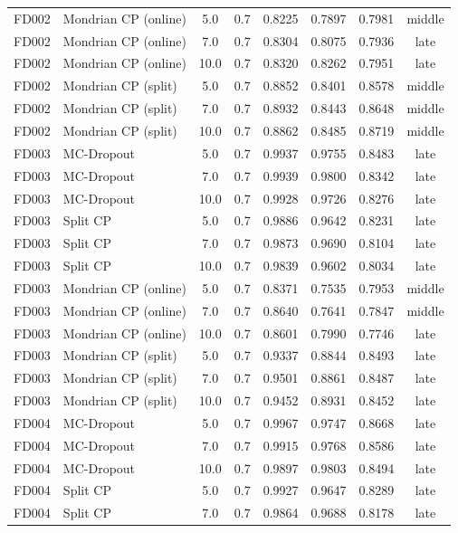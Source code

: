 \begin{table}[t]
\begin{tabular}{llcccccc}
FD002 & Mondrian CP (online) & 5.0 & 0.7 & 0.8225 & 0.7897 & 0.7981 & middle \\
FD002 & Mondrian CP (online) & 7.0 & 0.7 & 0.8304 & 0.8075 & 0.7936 & late \\
FD002 & Mondrian CP (online) & 10.0 & 0.7 & 0.8320 & 0.8262 & 0.7951 & late \\
FD002 & Mondrian CP (split) & 5.0 & 0.7 & 0.8852 & 0.8401 & 0.8578 & middle \\
FD002 & Mondrian CP (split) & 7.0 & 0.7 & 0.8932 & 0.8443 & 0.8648 & middle \\
FD002 & Mondrian CP (split) & 10.0 & 0.7 & 0.8862 & 0.8485 & 0.8719 & middle \\
FD003 & MC-Dropout & 5.0 & 0.7 & 0.9937 & 0.9755 & 0.8483 & late \\
FD003 & MC-Dropout & 7.0 & 0.7 & 0.9939 & 0.9800 & 0.8342 & late \\
FD003 & MC-Dropout & 10.0 & 0.7 & 0.9928 & 0.9726 & 0.8276 & late \\
FD003 & Split CP & 5.0 & 0.7 & 0.9886 & 0.9642 & 0.8231 & late \\
FD003 & Split CP & 7.0 & 0.7 & 0.9873 & 0.9690 & 0.8104 & late \\
FD003 & Split CP & 10.0 & 0.7 & 0.9839 & 0.9602 & 0.8034 & late \\
FD003 & Mondrian CP (online) & 5.0 & 0.7 & 0.8371 & 0.7535 & 0.7953 & middle \\
FD003 & Mondrian CP (online) & 7.0 & 0.7 & 0.8640 & 0.7641 & 0.7847 & middle \\
FD003 & Mondrian CP (online) & 10.0 & 0.7 & 0.8601 & 0.7990 & 0.7746 & late \\
FD003 & Mondrian CP (split) & 5.0 & 0.7 & 0.9337 & 0.8844 & 0.8493 & late \\
FD003 & Mondrian CP (split) & 7.0 & 0.7 & 0.9501 & 0.8861 & 0.8487 & late \\
FD003 & Mondrian CP (split) & 10.0 & 0.7 & 0.9452 & 0.8931 & 0.8452 & late \\
FD004 & MC-Dropout & 5.0 & 0.7 & 0.9967 & 0.9747 & 0.8668 & late \\
FD004 & MC-Dropout & 7.0 & 0.7 & 0.9915 & 0.9768 & 0.8586 & late \\
FD004 & MC-Dropout & 10.0 & 0.7 & 0.9897 & 0.9803 & 0.8494 & late \\
FD004 & Split CP & 5.0 & 0.7 & 0.9927 & 0.9647 & 0.8289 & late \\
FD004 & Split CP & 7.0 & 0.7 & 0.9864 & 0.9688 & 0.8178 & late \\

\end{tabular}
\end{table}
